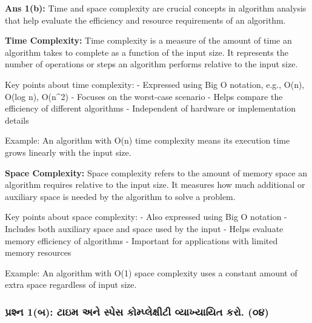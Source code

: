 \textbf{Ans 1(b):} Time and space complexity are crucial concepts in
algorithm analysis that help evaluate the efficiency and resource
requirements of an algorithm.

\textbf{Time Complexity:} Time complexity is a measure of the amount of
time an algorithm takes to complete as a function of the input size. It
represents the number of operations or steps an algorithm performs
relative to the input size.

Key points about time complexity: - Expressed using Big O notation,
e.g., O(n), O(log n), O(n\^{}2) - Focuses on the worst-case scenario -
Helps compare the efficiency of different algorithms - Independent of
hardware or implementation details

Example: An algorithm with O(n) time complexity means its execution time
grows linearly with the input size.

\textbf{Space Complexity:} Space complexity refers to the amount of
memory space an algorithm requires relative to the input size. It
measures how much additional or auxiliary space is needed by the
algorithm to solve a problem.

Key points about space complexity: - Also expressed using Big O notation
- Includes both auxiliary space and space used by the input - Helps
evaluate memory efficiency of algorithms - Important for applications
with limited memory resources

Example: An algorithm with O(1) space complexity uses a constant amount
of extra space regardless of input size.

\begin{Shaded}
\begin{Highlighting}[]
\end{Highlighting}
\end{Shaded}

\hypertarget{uxaaauxab0uxab6uxaa8-1uxaac-uxa9fuxa87uxaae-uxa85uxaa8-uxab8uxaaauxab8-uxa95uxaaeuxaaauxab2uxa95uxab7uxa9f-uxab5uxaafuxa96uxaafuxaafuxaa4-uxa95uxab0.-uxae6uxaea}{%
\subsubsection{પ્રશ્ન 1(બ): ટાઇમ અને સ્પેસ કોમ્પ્લેક્ષીટી વ્યાખ્યાયિત કરો.
(૦૪)}\label{uxaaauxab0uxab6uxaa8-1uxaac-uxa9fuxa87uxaae-uxa85uxaa8-uxab8uxaaauxab8-uxa95uxaaeuxaaauxab2uxa95uxab7uxa9f-uxab5uxaafuxa96uxaafuxaafuxaa4-uxa95uxab0.-uxae6uxaea}}

